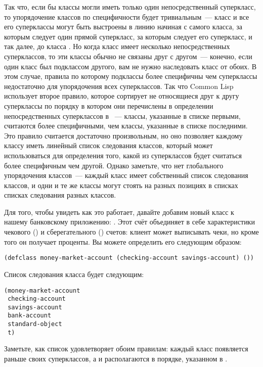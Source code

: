 Так что, если бы классы могли иметь только один непосредственный суперкласс, то
упорядочение классов по специфичности будет тривиальным~--- класс и все его суперклассы
могут быть выстроены в линию начиная с самого класса, за которым следует один прямой
суперкласс, за которым следует его суперкласс, и так далее, до класса .  Но когда
класс имеет несколько непосредственных суперклассов, то эти классы обычно не связаны друг
с другом~--- конечно, если один класс был подклассом другого, вам не нужно наследовать
класс от обоих.  В этом случае, правила по которому подклассы более специфичны чем
суперклассы недостаточно для упорядочения всех суперклассов.  Так что Common Lisp
использует второе правило, которое сортирует не относящиеся друг к другу суперклассы по
порядку в котором они перечислены в определении непосредственных суперклассов в
~--- классы, указанные в списке первыми, считаются более специфичными, чем
классы, указанные в списке последними.  Это правило считается достаточно произвольным, но
оно позволяет каждому классу иметь линейный список следования классов, который может
использоваться для определения того, какой из суперклассов будет считаться более
специфичным чем другой.  Однако заметьте, что нет глобального упорядочения классов~---
каждый класс имеет собственный список следования классов, и одни и те же классы могут
стоять на разных позициях в списках списках следования разных классов.

Для того, чтобы увидеть как это работает, давайте добавим новый класс к нашему банковскому
приложению: .  Этот счёт объединяет в себе характеристики
чекового () и сберегательного () счетов:
клиент может выписывать чеки, но кроме того он получает проценты.  Вы можете определить
его следующим образом:

\begin{lstlisting}
(defclass money-market-account (checking-account savings-account) ())
\end{lstlisting}

Список следования класса  будет следующим:

\begin{lstlisting}
(money-market-account
 checking-account
 savings-account
 bank-account
 standard-object
 t)
\end{lstlisting}

Заметьте, как список удовлетворяет обоим правилам: каждый класс появляется раньше своих
суперклассов, а  и  располагаются в порядке,
указанном в .


